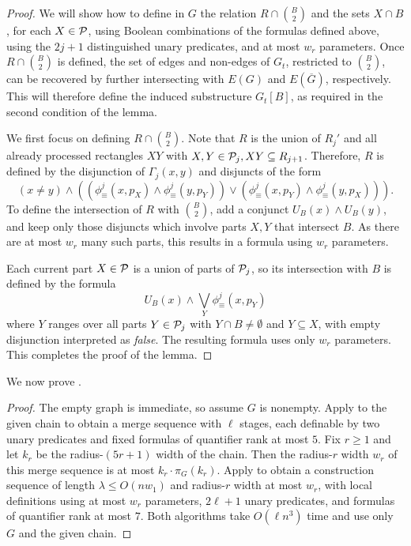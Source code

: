 \begin{proof}
We will show how to define in $G$ the relation $R\cap \binom{B}{2}$ and the sets $X\cap B$, for each $X\in \mathcal P$,
using Boolean combinations of the formulas defined above, 
using the $2j+1$ distinguished unary predicates, and at most $w_r$ parameters.
Once $R\cap \binom{B}{2}$ is defined, the set of  edges and non-edges of $G_t$, restricted to $\binom{B}{2}$, can be recovered by further intersecting with $E(G)$ and $E(\overline G)$, respectively. This will therefore define the induced substructure $G_t[B]$, as required in the second condition of the lemma.

\medskip
We first focus on defining $R\cap \binom{B}{2}$.
Note that $R$ 
is the union of $R_j'$
and all already processed rectangles $XY$ with $X,Y\in\mathcal P_j, XY\subseteq R_{j+1}$.
Therefore, $R$ is defined by the disjunction 
of $\Gamma_j(x,y)$ and disjuncts of the form
\[
 (x\neq y)\land \left((\phi_\equiv^{j}(x,p_X)\land\phi_\equiv^{j}(y,p_Y))
 \lor
 (\phi_\equiv^{j}(x,p_Y)\land\phi_\equiv^{j}(y,p_X))\right).
\]
To define the intersection of $R$ with $\binom{B}{2}$,
add a conjunct $U_B(x)\land U_B(y)$,
and keep only those disjuncts which involve parts $X,Y$ that intersect $B$. As there are at most $w_r$ many such parts, this results in a formula
 using $w_r$ parameters.


Each current part $X\in\mathcal P$ is a union of parts of $\mathcal P_j$, so its intersection with $B$ is defined by 
the formula
$$U_B(x)\land \bigvee_{Y}\phi_\equiv^{j}(x,p_Y)$$ where $Y$ ranges over all parts $Y\in\mathcal P_j$ with $Y\cap B\neq\emptyset$ and $Y\subseteq X$, with empty disjunction interpreted as \emph{false}.
The resulting formula uses only $w_r$ parameters.
This completes the proof of the lemma.
\end{proof}




    
We now prove .
\lembetterdefinablemwfromsets*

\begin{proof}
    The empty graph is immediate, so assume $G$ is nonempty.
    Apply  to the given chain to obtain a merge sequence with $\ell$ stages, each definable by two unary predicates and fixed formulas of quantifier rank at most $5$.
    Fix $r\ge 1$ and let $k_r$ be the radius-$(5r+1)$ width of the chain.
    Then the radius-$r$ width $w_r$ of this merge sequence is at most $k_r\cdot \pi_G(k_r)$. Apply  to obtain a construction sequence of length $\lambda\le O(nw_1)$ and radius-$r$ width at most $w_r$, with local definitions using at most $w_r$ parameters, $2\ell+1$ unary predicates, and formulas of quantifier rank at most $7$.
    Both algorithms take $O(\ell n^3)$ time and use only $G$ and the given chain.
\end{proof}

